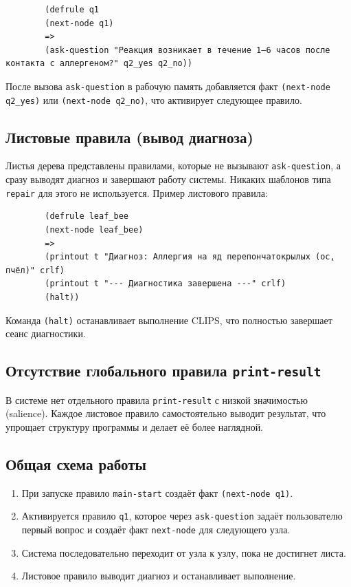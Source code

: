 \documentclass[a4paper, final]{extarticle}
\begin{document}
	\begin{lstlisting}
		(defrule q1
		(next-node q1)
		=>
		(ask-question "Реакция возникает в течение 1–6 часов после контакта с аллергеном?" q2_yes q2_no))
	\end{lstlisting}
	
	После вызова \texttt{ask-question} в рабочую память добавляется факт \texttt{(next-node q2\_yes)} или \texttt{(next-node q2\_no)}, что активирует следующее правило.
	
	\subsection{Листовые правила (вывод диагноза)}
	
	Листья дерева представлены правилами, которые не вызывают \texttt{ask-question}, а сразу выводят диагноз и завершают работу системы. Никаких шаблонов типа \texttt{repair} для этого не используется. Пример листового правила:
	
	\begin{lstlisting}
		(defrule leaf_bee
		(next-node leaf_bee)
		=>
		(printout t "Диагноз: Аллергия на яд перепончатокрылых (ос, пчёл)" crlf)
		(printout t "--- Диагностика завершена ---" crlf)
		(halt))
	\end{lstlisting}
	
	Команда \texttt{(halt)} останавливает выполнение CLIPS, что полностью завершает сеанс диагностики.
	
	\subsection{Отсутствие глобального правила \texttt{print-result}}
	
	В системе нет отдельного правила \texttt{print-result} с низкой значимостью (salience). Каждое листовое правило самостоятельно выводит результат, что упрощает структуру программы и делает её более наглядной.
	
	\subsection{Общая схема работы}
	
	\begin{enumerate}
		\item При запуске правило \texttt{main-start} создаёт факт \texttt{(next-node q1)}.
		\item Активируется правило \texttt{q1}, которое через \texttt{ask-question} задаёт пользователю первый вопрос и создаёт факт \texttt{next-node} для следующего узла.
		\item Система последовательно переходит от узла к узлу, пока не достигнет листа.
		\item Листовое правило выводит диагноз и останавливает выполнение.
	\end{enumerate}
	
\end{document}
